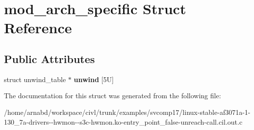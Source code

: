 \hypertarget{structmod__arch__specific}{}\section{mod\+\_\+arch\+\_\+specific Struct Reference}
\label{structmod__arch__specific}
\subsection*{Public Attributes}
\begin{DoxyCompactItemize}
\item 
\hypertarget{structmod__arch__specific_a0d14a11704213a46b8a096fca1aaf270}{}struct unwind\+\_\+table $\ast$ {\bfseries unwind} \mbox{[}5\+U\mbox{]}\label{structmod__arch__specific_a0d14a11704213a46b8a096fca1aaf270}

\end{DoxyCompactItemize}


The documentation for this struct was generated from the following file\+:\begin{DoxyCompactItemize}
\item 
/home/arnabd/workspace/civl/trunk/examples/svcomp17/linux-\/stable-\/af3071a-\/1-\/130\+\_\+7a-\/drivers-\/-\/hwmon-\/-\/s3c-\/hwmon.\+ko-\/entry\+\_\+point\+\_\+false-\/unreach-\/call.\+cil.\+out.\+c\end{DoxyCompactItemize}

